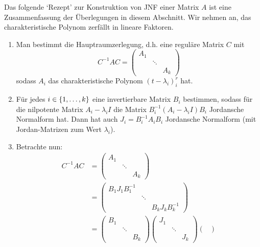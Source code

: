 \begin{bem}
	Das folgende `Rezept' zur Konstruktion von JNF einer Matrix $A$ ist eine Zusammenfassung der Überlegungen in diesem Abschnitt. Wir nehmen an, das charakteristische Polynom zerfällt in lineare Faktoren. 
	\begin{enumerate}
		\item
			Man bestimmt die Hauptraumzerlegung, d.h. eine reguläre Matrix $ C $ mit
			\begin{equation*}
				C^{-1}AC = \begin{pmatrix}
					A_1 && \\
					& \ddots & \\
					&& A_k
				\end{pmatrix}
			\end{equation*}
			sodass $ A_i $ das charakteristische Polynom $ (t-\lambda_i)^r_i $ hat.
		\item
			Für jedes $ i \in \{ 1,\ldots,k \} $ eine invertierbare Matrix $ B_i $ bestimmen, sodass für die nilpotente Matrix $ A_i - \lambda_i I $ die Matrix $ B_i^{-1}(A_i-\lambda_iI)B_i $ Jordansche Normalform hat. Dann hat auch $ J_i = B_i^{-1}A_iB_i $ Jordansche Normalform (mit Jordan-Matrizen zum Wert $ \lambda_i $).
		\item
			Betrachte nun:
			\begin{align*}
				C^{-1}AC &= \begin{pmatrix}
					A_1 && \\
					& \ddots & \\
					&& A_k
				\end{pmatrix} \\ & = \begin{pmatrix}
					B_1J_1B_1^{-1} && \\
					& \ddots & \\
					&& B_kJ_kB_k^{-1}
				\end{pmatrix} \\
				&= \begin{pmatrix}
					B_1 && \\
					& \ddots & \\
					&& B_k
				\end{pmatrix} \begin{pmatrix}
					J_1 && \\
					& \ddots & \\
					&& J_k
				\end{pmatrix} \begin{pmatrix}

\end{pmatrix}
\end{align*}
\end{enumerate}
\end{bem}
